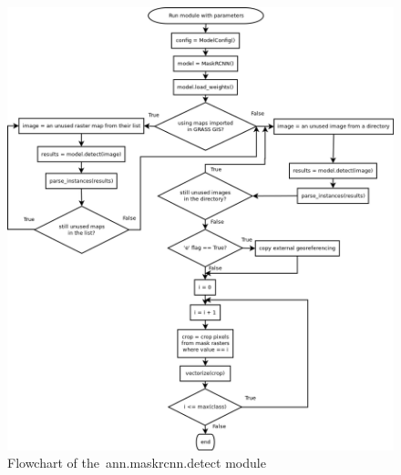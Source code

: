 \begin{figure}[H]
   \centering
	\includegraphics[width=\linewidth]{./pictures/detect_dia.png}
	\caption[ann.maskrcnn.detect flowchart]{Flowchart of the~ann.maskrcnn.detect module}
      \label{fig:detect}
\end{figure}

